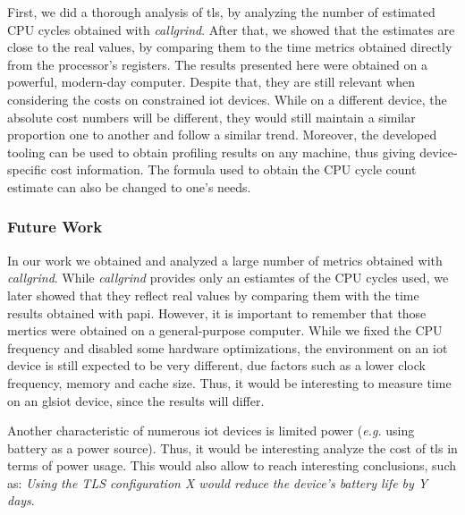 First, we did a thorough analysis of \gls{tls}, by analyzing the number of estimated CPU cycles obtained with \textit{callgrind}.
After that, we showed that the estimates are close to the real values, by comparing them to the time metrics obtained directly from
the processor's registers. The results presented here were obtained on a powerful, modern-day computer. Despite that, they are still
relevant when considering the costs on constrained \gls{iot} devices. While on a different device, the absolute cost 
numbers will be different, they would still maintain a similar proportion one to another and follow a similar trend.
Moreover, the developed tooling can be used to obtain profiling results on any machine, thus giving device-specific 
cost information. The formula used to obtain the CPU cycle count estimate can also be changed to one's needs.

\subsubsection{Future Work}

In our work we obtained and analyzed a large number of metrics obtained with \textit{callgrind}. While \textit{callgrind}
provides only an estiamtes of the CPU cycles used, we later showed  that they reflect real values by comparing them with the
time results obtained with \gls{papi}. However, it is important to remember that those mertics were obtained on a general-purpose
computer. While we fixed the CPU frequency and disabled some hardware optimizations, the environment on an \gls{iot} device is still
expected to be very different, due factors such as a lower clock frequency, memory and cache size. Thus, it would be interesting to 
measure time on an gls{iot} device, since the results will differ.

Another characteristic of numerous \gls{iot} devices is limited power (\textit{e.g.} using battery as a power source). 
Thus, it would be interesting analyze the cost of \gls{tls} in terms of power usage. This would also allow to reach 
interesting conclusions, such as: \textit{Using the TLS configuration X would reduce the device's battery life by Y days}.